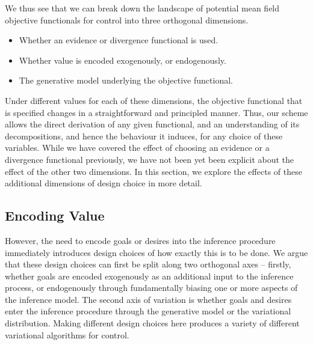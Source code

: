 We thus see that we can break down the landscape of potential mean field objective functionals for control into three orthogonal dimensions. 
\begin{itemize}
    \item Whether an evidence or divergence functional is used.
    \item Whether value is encoded exogenously, or endogenously.
    \item The generative model underlying the objective functional.
\end{itemize}


Under different values for each of these dimensions, the objective functional that is specified changes in a straightforward and principled manner. Thus, our scheme allows the direct derivation of any given functional, and an understanding of its decompositions, and hence the behaviour it induces, for any choice of these variables. While we have covered the effect of choosing an evidence or a divergence functional previously, we have not been yet been explicit about the effect of the other two dimensions. In this section, we explore the effects of these additional dimensions of design choice in more detail.


\subsection{Encoding Value}

However, the need to encode goals or desires into the inference procedure immediately introduces design choices of how exactly this is to be done. We argue that these design choices can first be split along two orthogonal axes -- firstly, whether goals are encoded exogenously as an additional input to the inference process, or endogenously through fundamentally biasing one or more aspects of the inference model. The second axis of variation is whether goals and desires enter the inference procedure through the generative model or the variational distribution. Making different design choices here produces a variety of different variational algorithms for control.


